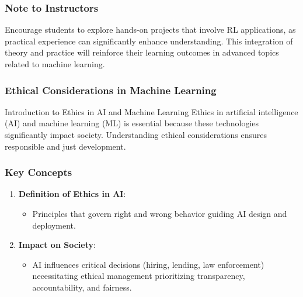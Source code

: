 \documentclass[aspectratio=169]{beamer}
\begin{document}
\begin{frame}[fragile]
    \frametitle{Note to Instructors}
    Encourage students to explore hands-on projects that involve RL applications, as practical experience can significantly enhance understanding. This integration of theory and practice will reinforce their learning outcomes in advanced topics related to machine learning.
\end{frame}

\begin{frame}[fragile]
    \frametitle{Ethical Considerations in Machine Learning}
    \begin{block}{Introduction to Ethics in AI and Machine Learning}
        Ethics in artificial intelligence (AI) and machine learning (ML) is essential because these technologies significantly impact society. Understanding ethical considerations ensures responsible and just development.
    \end{block}
\end{frame}

\begin{frame}[fragile]
    \frametitle{Key Concepts}
    \begin{enumerate}
        \item \textbf{Definition of Ethics in AI}:
        \begin{itemize}
            \item Principles that govern right and wrong behavior guiding AI design and deployment.
        \end{itemize}

        \item \textbf{Impact on Society}:
        \begin{itemize}
            \item AI influences critical decisions (hiring, lending, law enforcement) necessitating ethical management prioritizing transparency, accountability, and fairness.
        \end{itemize}
    \end{enumerate}
\end{frame}
\end{document}
